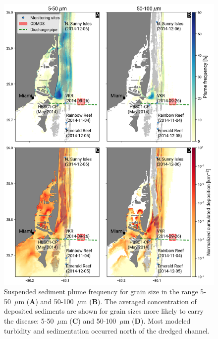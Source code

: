 \documentclass[preprint,12pt,authoryear]{elsarticle}
\begin{document}
\begin{figure}
	\centering
	\includegraphics[width=.9\textwidth]{figures/fig2_stokes4_symmetrical.png}
    \caption{Suspended sediment plume frequency for grain size in the range 5-50~$\mu$m (\textbf{A}) and 50-100~$\mu$m (\textbf{B}). The averaged concentration of deposited sediments are shown for grain sizes more likely to carry the disease: 5-50~$\mu$m (\textbf{C}) and  50-100~$\mu$m (\textbf{D}). Most modeled turbidity and sedimentation occurred north of the dredged channel.}
	\label{fig:onset_depo}
\end{figure}
\end{document}
